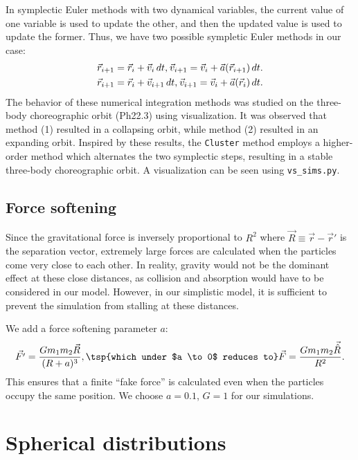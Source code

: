 \documentclass{article}
\begin{document}
In symplectic Euler methods with two dynamical variables, the current value
of one variable is used to update the other, and then the updated value
is used to update the former. Thus, we have two possible sympletic Euler
methods in our case:
\begin{align}
    \vec r_{i+1} = \vec r_i + \vec v_i \, dt,
    \sp{}
    \vec v_{i+1} = \vec v_i + \vec a(\vec r_{i+1}) \, dt.
    \\
    \vec r_{i+1} = \vec r_i + \vec v_{i + 1} \, dt,
    \sp{}
    \vec v_{i+1} = \vec v_i + \vec a(\vec r_i) \, dt.
\end{align}
The behavior of these numerical integration methods was studied on the
three-body choreographic orbit (Ph22.3) using visualization. It was observed
that method (1) resulted in a collapsing orbit, while method (2) resulted
in an expanding orbit. Inspired by these results, the \texttt{Cluster}
method employs a higher-order method which alternates the two symplectic
steps, resulting in a stable three-body choreographic orbit. A visualization
can be seen using \texttt{vs_sims.py}.

\subsection{Force softening}

Since the gravitational force is inversely proportional to
$R^2$ where $\vec R \equiv \vec r - \vec r'$ is the separation vector,
extremely large forces are calculated when the particles come very close
to each other. In reality, gravity would not be the dominant effect at these
close distances, as collision and absorption would have to be considered in
our model. However, in our simplistic model, it is sufficient to prevent the
simulation from stalling at these distances.

We add a force softening parameter $a$:
\begin{align}
    \vec {F'} = {G m_1 m_2 \vec R \over (R + a)^3},
    \tsp{which under $a \to 0$ reduces to}
    \vec F = {G m_1 m_2 \vec{\hat R} \over R^2}.
\end{align}
This ensures that a finite ``fake force'' is calculated even when the
particles occupy the same position. We choose $a = 0.1$, $G = 1$ for our
simulations.


\section{Spherical distributions}
\end{document}
